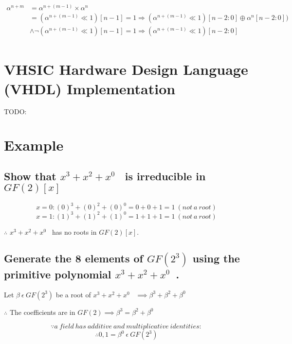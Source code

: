 \documentclass[paper=usletter, fontsize=12pt]{article}
\newcommand{\polynomial}{$x^{3}+x^{2}+x^{0}$}
\begin{document}
            \begin{equation*}
                \begin{split}
                    \alpha^{n+m} & =\alpha^{n+(m-1)}\times \alpha^{n} \\
                    & = (\alpha^{n+(m-1)} \ll 1 )[n-1] = 1 \Longrightarrow ( \alpha^{n+(m-1)} \ll 1 )[n-2:0] \oplus \alpha^{n}[n-2:0]) \\
                    & \wedge \neg (\alpha^{n+(m-1)} \ll 1 )[n-1] = 1 \Longrightarrow ( \alpha^{n+(m-1)} \ll 1 )[n-2:0] \\
                \end{split}
            \end{equation*}

        \newpage

    \section{VHSIC Hardware Design Language (VHDL) Implementation}
    TODO:

    \section{Example}
        \subsection{Show that \polynomial~ is irreducible in $GF(2)[x]$}

            \[ x=0: (0)^{3}+(0)^{2}+(0)^{0}=0+0+1=1 \ (not \ a \ root) \]
            \[ x=1: (1)^{3}+(1)^{2}+(1)^{0}=1+1+1=1 \ (not \ a \ root) \]
            \centerline{$\therefore$ \polynomial~ has no roots in $GF(2)[x]$.}

        \subsection{Generate the 8 elements of $GF(2^{3})$ using the primitive polynomial \polynomial~.}

            \centerline{Let $\beta \ \epsilon \ GF(2^{3})$ be a root of \polynomial~ $\implies \beta^{3}+\beta^{2}+\beta^{0}$}

            \hspace*{\fill}
            \centerline{$\therefore$ The coefficients are in $GF(2) \implies \beta^{3}=\beta^{2}+\beta^{0}$}

            \[ \because a \ field \ has \ additive \ and \ multiplicative \ identities: \]
            \[ \therefore 0, 1=\beta^{0} \ \epsilon \ GF(2^{3}) \]
\end{document}
